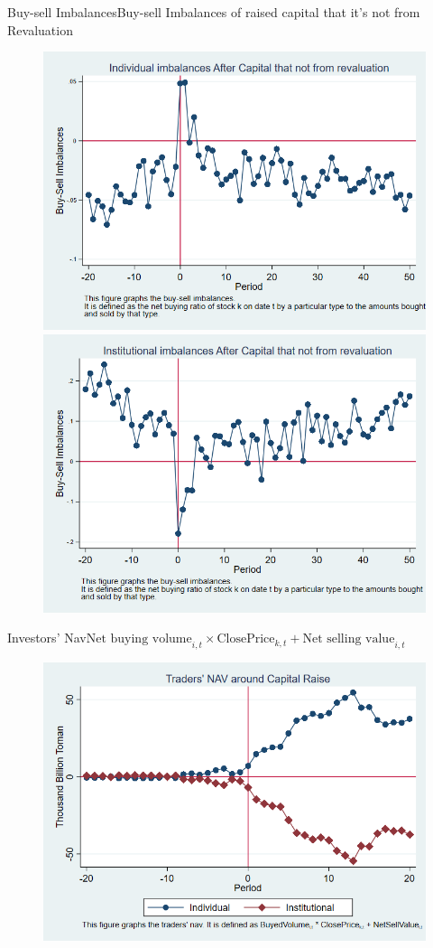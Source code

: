\documentclass{beamer}
\begin{document}
	\begin{frame}{Buy-sell Imbalances}{Buy-sell Imbalances of raised capital that it's not from Revaluation}
		\begin{figure}
			\centering
			\includegraphics[width=0.45\linewidth]{Output/IndImb_NoRevaluation.png}
			\includegraphics[width=0.45\linewidth]{Output/InsImb_NoRevaluation.png}
			\label{fig:indimbnorevaluation}
		\end{figure}
	\end{frame}
	
	\begin{frame}{Investors' Nav}{$ \text{Net buying volume}_{i,t} \times \text{ClosePrice}_{k,t} + \text{Net selling value}_{i,t} $}
		\begin{figure}
			\centering
			\includegraphics[width=0.65\linewidth]{Output/IndInsNav.png}
			\label{fig:IndInsNav}
		\end{figure}
	\end{frame}
	
	
	
\end{document}
